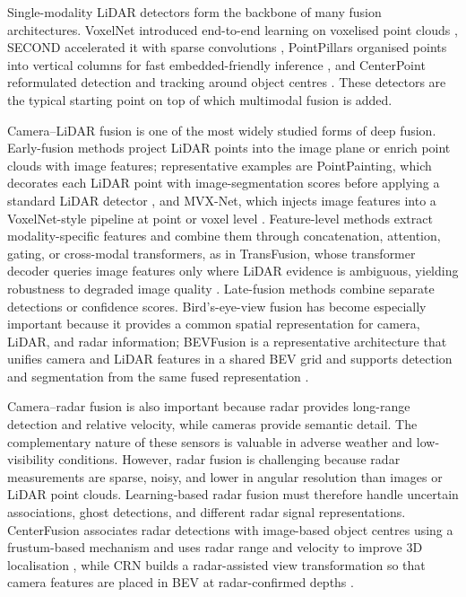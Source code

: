\documentclass{ieeeaccess}
\newcommand{\added}[1]{\textcolor{RevisionBlue}{#1}}
\begin{document}
\added{Single-modality LiDAR detectors form the backbone of many fusion architectures. VoxelNet introduced end-to-end learning on voxelised point clouds \cite{zhou2018_voxelnet}, SECOND accelerated it with sparse convolutions \cite{yan2018_second}, PointPillars organised points into vertical columns for fast embedded-friendly inference \cite{lang2019_pointpillars}, and CenterPoint reformulated detection and tracking around object centres \cite{yin2021_centerpoint}. These detectors are the typical starting point on top of which multimodal fusion is added.}

Camera--LiDAR fusion is one of the most widely studied forms of deep fusion. Early-fusion methods project LiDAR points into the image plane or enrich point clouds with image features\added{; representative examples are PointPainting, which decorates each LiDAR point with image-segmentation scores before applying a standard LiDAR detector \cite{vora2020_pointpainting}, and MVX-Net, which injects image features into a VoxelNet-style pipeline at point or voxel level \cite{sindagi2019_mvxnet}}. Feature-level methods extract modality-specific features and combine them through concatenation, attention, gating, or cross-modal transformers\added{, as in TransFusion, whose transformer decoder queries image features only where LiDAR evidence is ambiguous, yielding robustness to degraded image quality \cite{bai2022_transfusion}}. Late-fusion methods combine separate detections or confidence scores. Bird's-eye-view fusion has become especially important because it provides a common spatial representation for camera, LiDAR, and radar information\added{; BEVFusion is a representative architecture that unifies camera and LiDAR features in a shared BEV grid and supports detection and segmentation from the same fused representation \cite{liu2023_bevfusion}}.

Camera--radar fusion is also important because radar provides long-range detection and relative velocity, while cameras provide semantic detail. The complementary nature of these sensors is valuable in adverse weather and low-visibility conditions. However, radar fusion is challenging because radar measurements are sparse, noisy, and lower in angular resolution than images or LiDAR point clouds. Learning-based radar fusion must therefore handle uncertain associations, ghost detections, and different radar signal representations. \added{CenterFusion associates radar detections with image-based object centres using a frustum-based mechanism and uses radar range and velocity to improve 3D localisation \cite{nabati2021_centerfusion}, while CRN builds a radar-assisted view transformation so that camera features are placed in BEV at radar-confirmed depths \cite{kim2023_crn}.}
\end{document}
